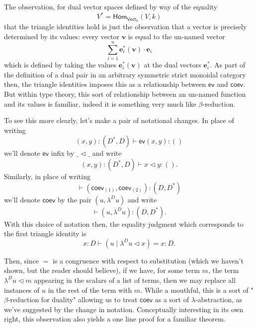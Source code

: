 \documentclass[pra,floatfix,
amsmath,superscriptaddress, 12pt]{article}
\theoremstyle{definition}
\newcommand{\evmap}{\mathsf{ev}}
\newcommand{\coev}{\mathsf{coev}}
\begin{document}
The observation, for dual vector spaces defined by way of the equality \[
V^*=\mathsf{Hom}_{\mathsf{Vect}_k}\left(V,k \right)
\]
that the triangle identities hold is just the observation that a vector is precisely determined by its values: every vector $\mathbf{v}$  is equal to the un-named vector
\[
\sum_{i=1}^{n}\mathbf{e}_i^*\left( \mathbf{v}\right)\cdot \mathbf{e}_i
\]
which is defined by taking the values $\mathbf{e}^*_{i}\left( \mathbf{v} \right)$ at the dual vectors $\mathbf{e}_i^*$.
As part of the definition of a dual pair in an arbitrary symmetric strict monoidal category then, the triangle identities imposes this as a relationship between $\evmap$ and $\coev$. But within type theory, this sort of relationship between an un-named function and its values is familiar, indeed it is something very much like $\beta$-reduction.

\par To see this more clearly, let's make a pair of notational changes. In place of writing 
\[
\left(x,y\right):\left(D^{*},D\right)\vdash\evmap\left(x,y\right):\left(\right)
\]
we'll denote $\evmap$ infix by $\_\triangleleft\_$ and write
\[
\left(x,y\right):\left(D^{*},D\right)\vdash x\triangleleft y:\left(\right).
\]
Similarly, in place of writing 
\[
\vdash\left(\coev_{\left(1\right)},\coev_{\left(2\right)}\right):\left(D,D^{*}\right)
\]
 we'll denote $\coev$ by the pair $\left(u,\lambda^{D}u\right)$
and write
\[
\vdash\left(u,\lambda^{D}u\right):\left(D,D^{*}\right).
\]
With this choice of notation then, the equality judgment which corresponds to
the first triangle identity is 
\[
x:D\vdash\left( u \; |\; \lambda^{D}u\triangleleft x\right)=x:D.
\]

\par

Then, since $=$ is a congruence with respect
to substitution (which we haven't shown, but the reader should believe), if we have, for some term $m$, the term $\lambda^{D}u\triangleleft m$
appearing in the scalars of a list of terms, then we may replace all
instances of $u$ in the rest of the term with $m$. While a mouthful,
this is a sort of "$\beta$-reduction for duality" allowing us to treat $\coev$ as a sort of $\lambda$-abstraction, as we've suggested by the change in notation. Conceptually interesting in its own right, this observation also yields a one line
proof for a familiar theorem.
\end{document}
